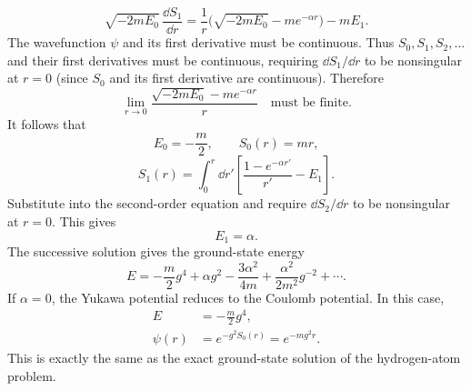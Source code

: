\begin{equation}
 \sqrt{-2mE_0}\,\frac{\dd S_1}{\dd r}
 =\frac1r\bigl(\sqrt{-2mE_0}-me^{-\alpha r}\bigr)-mE_1.
\end{equation}
The wavefunction $\psi$ and its first derivative must be continuous. Thus $S_0,S_1,S_2,\ldots$ and their first derivatives must be continuous, requiring $\dd S_1/\dd r$ to be nonsingular at $r=0$ (since $S_0$ and its first derivative are continuous). Therefore
\begin{equation}
 \lim_{r\to0}\frac{\sqrt{-2mE_0}-me^{-\alpha r}}{r}
 \quad\text{must be finite}.
\end{equation}
It follows that
\begin{equation}
 E_0=-\frac m2,\qquad S_0(r)=mr,
\end{equation}
\begin{equation}
 S_1(r)=\int_0^r\dd r'\left[
 \frac{1-e^{-\alpha r'}}{r'}-E_1\right].
\end{equation}
Substitute into the second-order equation and require $\dd S_2/\dd r$ to be nonsingular at $r=0$. This gives
\begin{equation}
 E_1=\alpha.
\end{equation}
The successive solution gives the ground-state energy
\begin{equation}
 E=-\frac m2g^4+\alpha g^2
 -\frac{3\alpha^2}{4m}
 +\frac{\alpha^2}{2m^2}g^{-2}+\cdots.
\end{equation}
If $\alpha=0$, the Yukawa potential reduces to the Coulomb potential. In this case,
\begin{equation}
 \boxed{\begin{aligned}
 E&=-\frac m2g^4,\\
 \psi(r)&=e^{-g^2S_0(r)}=e^{-mg^2r}.
 \end{aligned}}
\end{equation}
This is exactly the same as the exact ground-state solution of the hydrogen-atom problem.